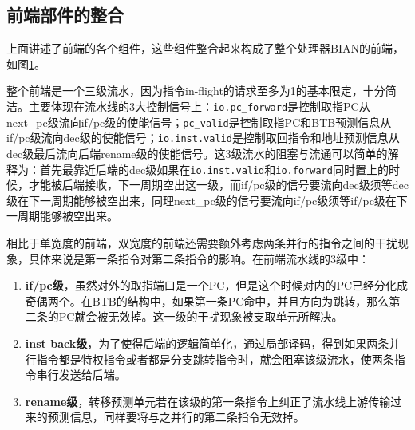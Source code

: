 \subsection{前端部件的整合}
上面讲述了前端的各个组件，这些组件整合起来构成了整个处理器BIAN的前端，如图\ref{fig:frontend}。
\begin{figure}[!htbp]
	\centering
	\label{fig:frontend}
\end{figure}

整个前端是一个三级流水，因为指令in-flight的请求至多为1的基本限定，十分简洁。主要体现在流水线的3大控制信号上：\texttt{io.pc\_forward}是控制取指PC从next\_pc级流向if/pc级的使能信号；\texttt{pc\_valid}是控制取指PC和BTB预测信息从if/pc级流向dec级的使能信号；\texttt{io.inst.valid}是控制取回指令和地址预测信息从dec级最后流向后端rename级的使能信号。这3级流水的阻塞与流通可以简单的解释为：首先最靠近后端的dec级如果在\texttt{io.inst.valid}和\texttt{io.forward}同时置上的时候，才能被后端接收，下一周期空出这一级，而if/pc级的信号要流向dec级须等dec级在下一周期能够被空出来，同理next\_pc级的信号要流向if/pc级须等if/pc级在下一周期能够被空出来。

相比于单宽度的前端，双宽度的前端还需要额外考虑两条并行的指令之间的干扰现象，具体来说是第一条指令对第二条指令的影响。在前端流水线的3级中：
\begin{enumerate}
	\item \textbf{if/pc级}，虽然对外的取指端口是一个PC，但是这个时候对内的PC已经分化成奇偶两个。在BTB的结构中，如果第一条PC命中，并且方向为跳转，那么第二条的PC就会被无效掉。这一级的干扰现象被支取单元所解决。
	\item \textbf{inst back级}，为了使得后端的逻辑简单化，通过局部译码，得到如果两条并行指令都是特权指令或者都是分支跳转指令时，就会阻塞该级流水，使两条指令串行发送给后端。
	\item \textbf{rename级}，转移预测单元若在该级的第一条指令上纠正了流水线上游传输过来的预测信息，同样要将与之并行的第二条指令无效掉。
\end{enumerate}

